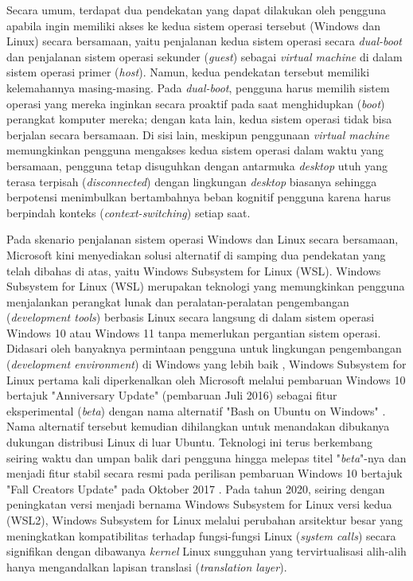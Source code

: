 Secara umum, terdapat dua pendekatan yang dapat dilakukan oleh pengguna apabila ingin memiliki akses ke kedua sistem operasi tersebut (Windows dan Linux) secara bersamaan, yaitu penjalanan kedua sistem operasi secara \textit{dual-boot} dan penjalanan sistem operasi sekunder (\textit{guest}) sebagai \textit{virtual machine} di dalam sistem operasi primer (\textit{host}). Namun, kedua pendekatan tersebut memiliki kelemahannya masing-masing. Pada \textit{dual-boot}, pengguna harus memilih sistem operasi yang mereka inginkan secara proaktif pada saat menghidupkan (\textit{boot}) perangkat komputer mereka; dengan kata lain, kedua sistem operasi tidak bisa berjalan secara bersamaan. Di sisi lain, meskipun penggunaan \textit{virtual machine} memungkinkan pengguna mengakses kedua sistem operasi dalam waktu yang bersamaan, pengguna tetap disuguhkan dengan antarmuka \textit{desktop} utuh yang terasa terpisah (\textit{disconnected}) dengan lingkungan \textit{desktop} biasanya sehingga berpotensi menimbulkan bertambahnya beban kognitif pengguna karena harus berpindah konteks (\textit{context-switching}) setiap saat.

Pada skenario penjalanan sistem operasi Windows dan Linux secara bersamaan, Microsoft kini menyediakan solusi alternatif di samping dua pendekatan yang telah dibahas di atas, yaitu Windows Subsystem for Linux (WSL). Windows Subsystem for Linux (WSL) merupakan teknologi yang memungkinkan pengguna menjalankan perangkat lunak dan peralatan-peralatan pengembangan (\textit{development tools}) berbasis Linux secara langsung di dalam sistem operasi Windows 10 atau Windows 11 tanpa memerlukan pergantian sistem operasi. Didasari oleh banyaknya permintaan pengguna untuk lingkungan pengembangan (\textit{development environment}) di Windows yang lebih baik \cite{some-background-on-why-bouow-was-planned}, Windows Subsystem for Linux pertama kali diperkenalkan oleh Microsoft melalui pembaruan Windows 10 bertajuk "Anniversary Update" (pembaruan Juli 2016) sebagai fitur eksperimental (\textit{beta}) dengan nama alternatif "Bash on Ubuntu on Windows" \cite{bouow-release-article}. Nama alternatif tersebut kemudian dihilangkan untuk menandakan dibukanya dukungan distribusi Linux di luar Ubuntu. Teknologi ini terus berkembang seiring waktu dan umpan balik dari pengguna hingga melepas titel "\textit{beta}"-nya dan menjadi fitur stabil secara resmi pada perilisan pembaruan Windows 10 bertajuk "Fall Creators Update" pada Oktober 2017 \cite{omgubuntu-wsl-exits-beta}. Pada tahun 2020, seiring dengan peningkatan versi menjadi bernama Windows Subsystem for Linux versi kedua (WSL2), Windows Subsystem for Linux melalui perubahan arsitektur besar yang meningkatkan kompatibilitas terhadap fungsi-fungsi Linux (\textit{system calls}) secara signifikan dengan dibawanya \textit{kernel} Linux sungguhan yang tervirtualisasi alih-alih hanya mengandalkan lapisan translasi (\textit{translation layer}).


